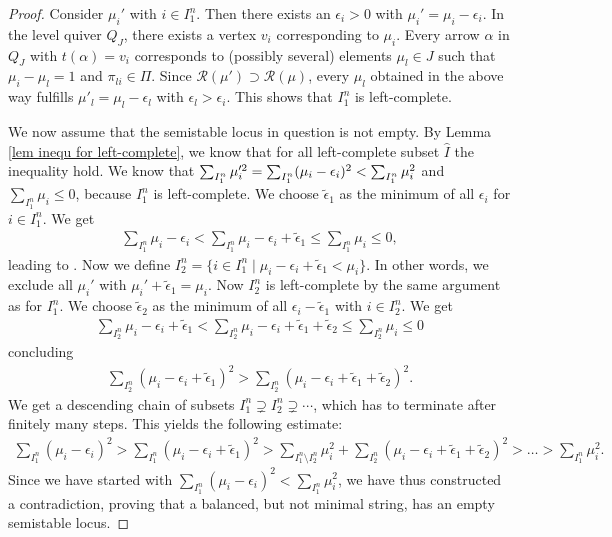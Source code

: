 \documentclass[10pt,a4paper]{amsart}
\newcommand{\R}{\mathcal{R}}
\begin{document}
\begin{proof}
Consider $\mu_i'$ with $i \in I^n_1$. Then there exists an $\epsilon_i >0$ with $\mu_i' = \mu_i - \epsilon_i$. In the level quiver $Q_J$, there exists a vertex $v_i$ corresponding to $\mu_i$. Every arrow $\alpha$ in $Q_J$ with $t(\alpha)= v_i$ corresponds to (possibly several) elements $\mu_l \in J$ such that $\mu_i - \mu_l = 1$ and $\pi_{li} \in \Pi$. Since $\R(\mu') \supset \R(\mu)$, every $\mu_l$ obtained in the above way fulfills $\mu'_l = \mu_l - \epsilon_l$ with $\epsilon_l > \epsilon_i$. This shows that $I^n_1$ is left-complete.

We now assume that the semistable locus in question is not empty.
By Lemma \ref{lem inequ for left-complete}, we know that for all left-complete subset $\hat{I}$ the inequality  hold.
We know that $\smash{\sum_{I^n_1} \mu_i'^2} = \sum_{I^n_1} (\mu_i - \epsilon_i)^2 < \sum_{I^n_1} \mu_i^2$ and $\sum_{I^n_1} \mu_i \leq 0$, because $I^n_1$ is left-complete. We choose $\tilde{\epsilon}_1$ as the minimum of all $\epsilon_i$ for $i \in I^n_1$. We get
\begin{align*}
\sum_{I^n_1} \mu_i -\epsilon_i < \sum_{I^n_1} \mu_i - \epsilon_i + \tilde{\epsilon}_1 \leq \sum_{I^n_1} \mu_i \leq 0 ,
\end{align*}
leading to .
Now we define
$
I^n_2 = \{i \in I^n_1 \mid \mu_i -\epsilon_i + \tilde{\epsilon}_1 < \mu_i\} $.
In other words, we exclude all $\mu_i'$ with $\mu_i' + \tilde{\epsilon}_1 = \mu_i$.
Now $I^n_2$ is left-complete by the same argument as for $I^n_1$. We choose $\tilde{\epsilon}_2$ as the minimum of all $\epsilon_i - \tilde{\epsilon}_1$ with $i \in I^n_2$. We get
\begin{align*}
\sum_{I^n_2} \mu_i - \epsilon_i +\tilde{\epsilon}_1 < \sum_{I^n_2} \mu_i - \epsilon_i+ \tilde{\epsilon}_1 + \tilde{\epsilon}_2 \leq \sum_{I^n_2} \mu_i \leq 0
\end{align*}
concluding
\begin{align*}
\sum_{I^n_2} (\mu_i - \epsilon_i + \tilde{\epsilon}_1)^2 > \sum_{I^n_2} (\mu_i - \epsilon_i + \tilde{\epsilon}_1 + \tilde{\epsilon}_2)^2.
\end{align*}
We get a descending chain of subsets
$
I_1^n \supsetneq I_2^n \supsetneq \cdots$,
which has to terminate after finitely many steps. This yields the following estimate:
\begin{align*}
\sum_{I^n_1} (\mu_i -\epsilon_i)^2 > \sum_{I^n_1} (\mu_i - \epsilon_i + \tilde{\epsilon}_1)^2 > \sum_{I^n_1 \setminus I^n_2} \mu_i^2 + \sum_{I^n_2} (\mu_i - \epsilon_i + \tilde{\epsilon}_1 + \tilde{\epsilon}_2)^2 > \dots > \sum_{I^n_1} \mu_i^2 .
\end{align*}
Since we have started with $\sum_{I^n_1} (\mu_i -\epsilon_i)^2 < \sum_{I^n_1} \mu_i^2$, we have thus constructed a contradiction, proving that a balanced, but not minimal string, has an empty semistable locus.
\end{proof}
\end{document}
